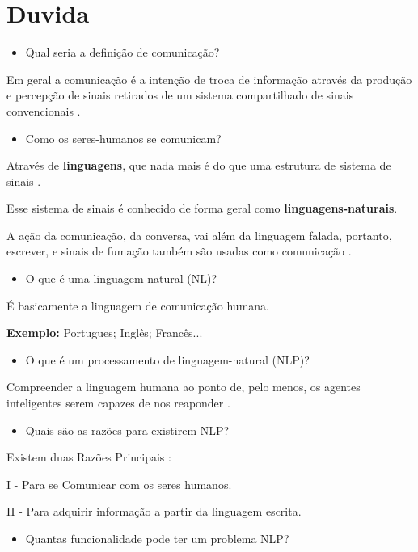 %
%
%

\newcommand{\q}[1] { %
  \begin{itemize}
  \item {\color{blue} #1}
  \end{itemize}
}

\section{Duvida}

\q{Qual seria a definição de comunicação?}

Em geral a comunicação é a intenção de troca de informação através da produção e percepção de sinais retirados de um sistema compartilhado de sinais convencionais \cite{russell:2009}.

\q{Como os seres-humanos se comunicam?}

Através de \textbf{linguagens}, que nada mais é do que uma estrutura de sistema de sinais \cite{russell:2009}.

Esse sistema de sinais é conhecido de forma geral como \textbf{linguagens-naturais}.

A ação da comunicação, da conversa, vai além da linguagem falada, portanto, escrever, e sinais de fumação também são usadas como comunicação \cite{russell:2009}.

\q{O que é uma linguagem-natural (NL)?}

É basicamente a linguagem de comunicação humana.

\textbf{Exemplo:} Portugues; Inglês; Francês...

\q{O que é um processamento de linguagem-natural (NLP)?}

Compreender a linguagem humana ao ponto de, pelo menos, os agentes inteligentes serem capazes de nos reaponder \cite{bird:2009}.

\q{Quais são as razões para existirem NLP?}

Existem duas Razões Principais \cite{russell:2009}:

I - Para se Comunicar com os seres humanos.

II - Para adquirir informação a partir da linguagem escrita.

\q{Quantas funcionalidade pode ter um problema NLP?}


